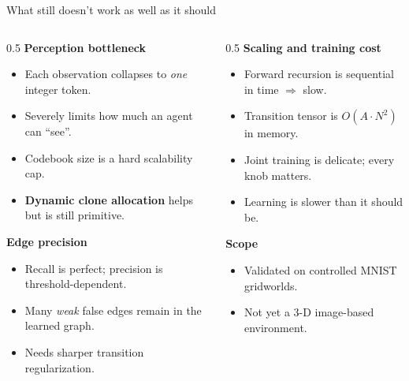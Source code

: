 \documentclass[aspectratio=169,10pt]{beamer}
\begin{document}
\begin{frame}{What still doesn't work as well as it should}
  \begin{columns}[T,onlytextwidth]
    \begin{column}{0.5\textwidth}
      \textbf{Perception bottleneck}
      \begin{itemize}\small\setlength\itemsep{0.15em}
        \item Each observation collapses to \emph{one} integer token.
        \item Severely limits how much an agent can ``see''.
        \item Codebook size is a hard scalability cap.
        \item \textbf{Dynamic clone allocation} helps but is still primitive.
      \end{itemize}

      \vspace{0.4em}
      \textbf{Edge precision}
      \begin{itemize}\small\setlength\itemsep{0.15em}
        \item Recall is perfect; precision is threshold-dependent.
        \item Many \emph{weak} false edges remain in the learned graph.
        \item Needs sharper transition regularization.
      \end{itemize}
    \end{column}
    \begin{column}{0.5\textwidth}
      \textbf{Scaling and training cost}
      \begin{itemize}\small\setlength\itemsep{0.15em}
        \item Forward recursion is sequential in time $\Rightarrow$ slow.
        \item Transition tensor is $O(A \cdot N^2)$ in memory.
        \item Joint training is delicate; every knob matters.
        \item Learning is slower than it should be.
      \end{itemize}

      \vspace{0.4em}
      \textbf{Scope}
      \begin{itemize}\small\setlength\itemsep{0.15em}
        \item Validated on controlled MNIST gridworlds.
        \item Not yet a 3-D image-based environment.
      \end{itemize}
    \end{column}
  \end{columns}
\end{frame}
\end{document}
